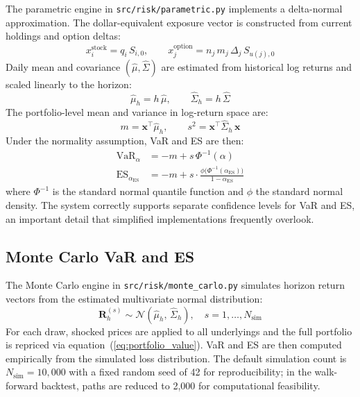 \documentclass[11pt]{article}
\newcommand{\code}[1]{\texttt{#1}}
\newcommand{\Norm}{\mathcal{N}}
\DeclareMathOperator{\VaR}{VaR}
\DeclareMathOperator{\ES}{ES}
\begin{document}
The parametric engine in \code{src/risk/parametric.py} implements a
delta-normal approximation.  The dollar-equivalent exposure vector is
constructed from current holdings and option deltas:
\begin{equation}
  x_i^{\mathrm{stock}} = q_i\, S_{i,0},
  \qquad
  x_j^{\mathrm{option}} = n_j\, m_j\, \Delta_j\, S_{u(j),0}
  \label{eq:exposure}
\end{equation}
Daily mean and covariance $(\hat{\mu}, \hat{\Sigma})$ are estimated from
historical log returns and scaled linearly to the horizon:
\begin{equation}
  \hat{\mu}_h = h\,\hat{\mu},
  \qquad
  \hat{\Sigma}_h = h\,\hat{\Sigma}
  \label{eq:horizon_scaling}
\end{equation}
The portfolio-level mean and variance in log-return space are:
\begin{equation}
  m = \mathbf{x}^{\!\top}\hat{\mu}_h,
  \qquad
  s^2 = \mathbf{x}^{\!\top}\hat{\Sigma}_h\,\mathbf{x}
  \label{eq:port_moments}
\end{equation}
Under the normality assumption, VaR and ES are then:
\begin{align}
  \VaR_\alpha
    &= -m + s\,\Phi^{-1}(\alpha)
  \label{eq:parametric_var}\\[4pt]
  \ES_{\alpha_{\mathrm{ES}}}
    &= -m + s\cdot\frac{\phi\!\bigl(\Phi^{-1}(\alpha_{\mathrm{ES}})\bigr)}
                       {1 - \alpha_{\mathrm{ES}}}
  \label{eq:parametric_es}
\end{align}
where $\Phi^{-1}$ is the standard normal quantile function and $\phi$ the
standard normal density.  The system correctly supports separate confidence
levels for VaR and ES, an important detail that simplified implementations
frequently overlook.

\subsection{Monte Carlo VaR and ES}

The Monte Carlo engine in \code{src/risk/monte\_carlo.py} simulates horizon
return vectors from the estimated multivariate normal distribution:
\begin{equation}
  \mathbf{R}_h^{(s)} \sim \Norm\!\left(\hat{\mu}_h,\, \hat{\Sigma}_h\right),
  \quad s = 1,\ldots,N_{\mathrm{sim}}
  \label{eq:mc_draws}
\end{equation}
For each draw, shocked prices are applied to all underlyings and the full
portfolio is repriced via equation~(\ref{eq:portfolio_value}).  VaR and ES are
then computed empirically from the simulated loss distribution.  The default
simulation count is $N_{\mathrm{sim}} = 10{,}000$ with a fixed random seed of
42 for reproducibility; in the walk-forward backtest, paths are reduced to
2{,}000 for computational feasibility.
\end{document}
